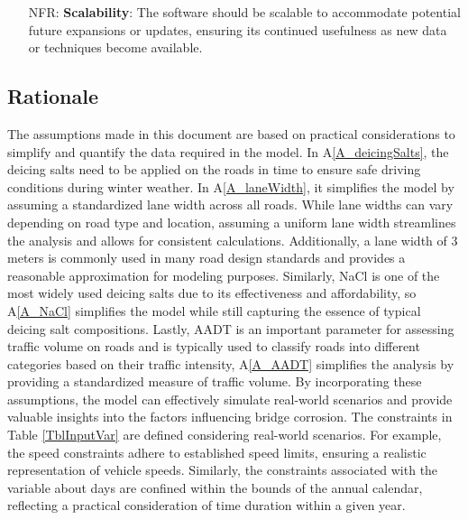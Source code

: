 \documentclass[12pt]{article}
\newcommand{\aref}[1]{A\ref{#1}}
\newcounter{nfrnum} %
\begin{document}
\begin{itemize}
\item[NFR\refstepcounter{nfrnum}\thenfrnum \label{NFR_Scalability}:]   \textbf{Scalability}: The software should be scalable to accommodate potential future expansions or updates, ensuring its continued usefulness as new data or techniques become available.

\end{itemize}

\subsection{Rationale}

The assumptions made in this document are based on practical considerations to simplify and quantify the data required in the model. In \aref{A_deicingSalts}, the deicing salts need to be applied on the roads in time to ensure safe driving conditions during winter weather. In \aref{A_laneWidth}, it simplifies the model by assuming a standardized lane width across all roads. While lane widths can vary depending on road type and location, assuming a uniform lane width streamlines the analysis and allows for consistent calculations. Additionally, a lane width of 3 meters is commonly used in many road design standards and provides a reasonable approximation for modeling purposes. Similarly, NaCl is one of the most widely used deicing salts due to its effectiveness and affordability, so \aref{A_NaCl} simplifies the model while still capturing the essence of typical deicing salt compositions. Lastly, AADT is an important parameter for assessing traffic volume on roads and is typically used to classify roads into different categories based on their traffic intensity, \aref{A_AADT} simplifies the analysis by providing a standardized measure of traffic volume. By incorporating these assumptions, the model can effectively simulate real-world scenarios and provide valuable insights into the factors influencing bridge corrosion.
The constraints in Table \ref{TblInputVar} are defined considering real-world scenarios. For example,  the speed constraints adhere to established speed limits, ensuring a realistic representation of vehicle speeds. Similarly, the constraints associated with the variable about days are confined within the bounds of the annual calendar, reflecting a practical consideration of time duration within a given year.


\end{document}
